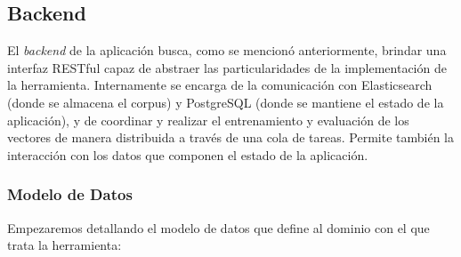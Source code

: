 \subsection{Backend}

El \textit{backend} de la aplicación busca, como se mencionó anteriormente, brindar una interfaz
RESTful capaz de abstraer las particularidades de la implementación de la herramienta. Internamente
se encarga de la comunicación con Elasticsearch (donde se almacena el corpus) y PostgreSQL (donde se
mantiene el estado de la aplicación), y de coordinar y realizar el entrenamiento y evaluación de los
vectores de manera distribuida a través de una cola de tareas. Permite también la interacción con
los datos que componen el estado de la aplicación.


\subsubsection{Modelo de Datos}

Empezaremos detallando el modelo de datos que define al dominio con el que trata la herramienta:

